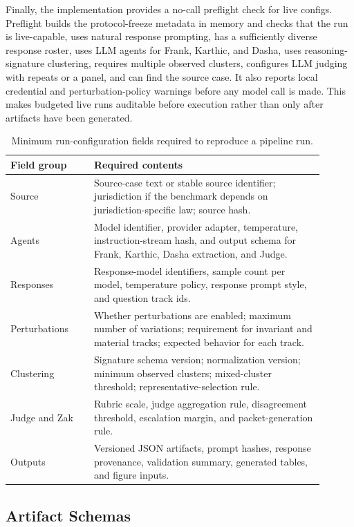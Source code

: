 Finally, the implementation provides a no-call preflight check for live
configs. Preflight builds the protocol-freeze metadata in memory and checks that
the run is live-capable, uses natural response prompting, has a sufficiently
diverse response roster, uses LLM agents for Frank, Karthic, and Dasha, uses
reasoning-signature clustering, requires multiple observed clusters, configures
LLM judging with repeats or a panel, and can find the source case. It also
reports local credential and perturbation-policy warnings before any model call
is made. This makes budgeted live runs auditable before execution rather than
only after artifacts have been generated.

\begin{table}[h]
\centering
\caption{Minimum run-configuration fields required to reproduce a pipeline run.}
\label{tab:run-config-contract}
\begin{tabular}{p{0.24\linewidth}p{0.66\linewidth}}
\toprule
Field group & Required contents \\
\midrule
Source & Source-case text or stable source identifier; jurisdiction if the benchmark depends on jurisdiction-specific law; source hash. \\
Agents & Model identifier, provider adapter, temperature, instruction-stream hash, and output schema for Frank, Karthic, Dasha extraction, and Judge. \\
Responses & Response-model identifiers, sample count per model, temperature policy, response prompt style, and question track ids. \\
Perturbations & Whether perturbations are enabled; maximum number of variations; requirement for invariant and material tracks; expected behavior for each track. \\
Clustering & Signature schema version; normalization version; minimum observed clusters; mixed-cluster threshold; representative-selection rule. \\
Judge and Zak & Rubric scale, judge aggregation rule, disagreement threshold, escalation margin, and packet-generation rule. \\
Outputs & Versioned JSON artifacts, prompt hashes, response provenance, validation summary, generated tables, and figure inputs. \\
\bottomrule
\end{tabular}
\end{table}

\subsection{Artifact Schemas}

